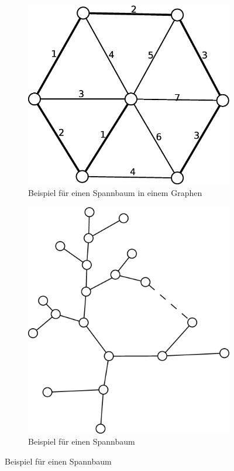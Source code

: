 \begin{figure}
\centering
\begin{subfigure}[h]{0.3\textwidth}
	\includegraphics[width=\linewidth]{19/Grafik/Spannbaum}
	\caption{Beispiel für einen Spannbaum in einem Graphen}
	\label{fig:Spannbaum}
\end{subfigure}
\begin{subfigure}[h]{0.3\textwidth}
	\includegraphics[width=\linewidth]{19/Grafik/SpannbaumBeispiel2}
	\caption{Beispiel für einen Spannbaum}
	\label{fig:Spannbaum2}
\end{subfigure}
\end{figure}

